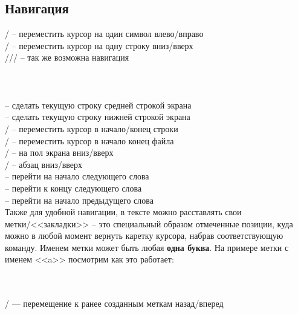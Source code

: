 \subsection*{Навигация}

\noindent
{}/ -- переместить курсор на один символ влево/вправо\\
/ -- переместить курсор на одну строку вниз/вверх\\
\keys{ \arrowkeyup }/\keys{ \arrowkeydown }/\keys{ \arrowkeyleft }/\keys{ \arrowkeyright } -- так же возможна навигация\\

\noindent
{}\\
\\
\\

\noindent
{} -- сделать текущую строку средней строкой экрана\\
 -- сделать текущую строку нижней строкой экрана\\

\noindent
{}/\keys{\$} -- переместить курсор в начало/конец строки\\
/ -- переместить курсор в начало конец файла\\
/ -- на пол экрана вниз/вверх\\
\keys{\}}/\keys{\{} -- абзац вниз/вверх\\

\noindent
{} -- перейти на начало следующего слова\\
 -- перейти к концу следующего слова\\
 -- перейти на начало предыдущего слова\\

Также для удобной навигации, в тексте можно расставлять свои метки/<<закладки>> -- это специальный образом отмеченные позиции, куда можно в любой момент вернуть каретку курсора, набрав соответствующую команду. Именем метки может быть любая \textbf{одна буква}. На примере метки с именем <<a>> посмотрим как это работает:

\noindent
{}\\
\\
/ — перемещение к ранее созданным меткам назад/вперед\\
\\

